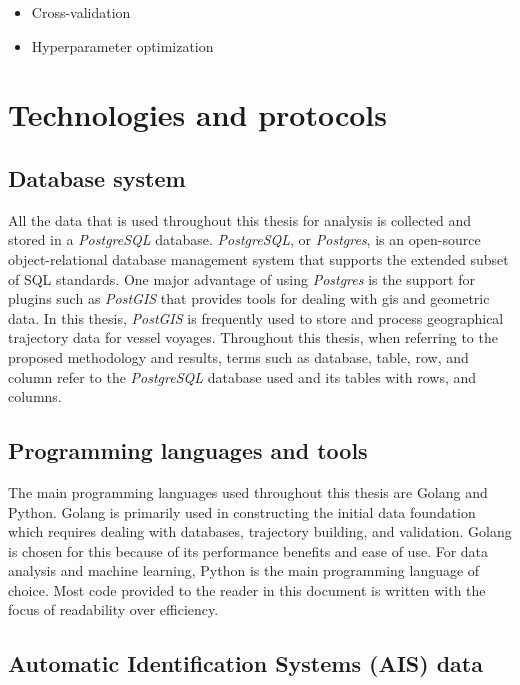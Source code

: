 \begin{itemize}
    \item Cross-validation
    \item Hyperparameter optimization
\end{itemize}

\section{Technologies and protocols}

\subsection{Database system}

All the data that is used throughout this thesis for analysis is collected and stored in a \textit{PostgreSQL} database. \textit{PostgreSQL}, or \textit{Postgres}, is an open-source object-relational database management system that supports the extended subset of SQL standards. One major advantage of using \textit{Postgres} is the support for plugins such as \textit{PostGIS} that provides tools for dealing with \acrshort{gis} and geometric data. In this thesis, \textit{PostGIS} is frequently used to store and process geographical trajectory data for vessel voyages. Throughout this thesis, when referring to the proposed methodology and results, terms such as database, table, row, and column refer to the \textit{PostgreSQL} database used and its tables with rows, and columns.

\subsection{Programming languages and tools}

The main programming languages used throughout this thesis are Golang and Python. Golang is primarily used in constructing the initial data foundation which requires dealing with databases, trajectory building, and validation. Golang is chosen for this because of its performance benefits and ease of use. For data analysis and machine learning, Python is the main programming language of choice. Most code provided to the reader in this document is written with the focus of readability over efficiency.

\subsection{Automatic Identification Systems (AIS) data}
\label{sec:ais_data}


